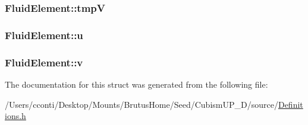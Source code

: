 \subsubsection[{tmp\+V}]{ Fluid\+Element\+::tmp\+V}\label{struct_fluid_element_a46027ac92e12443c175763fc0724a93c}
\hypertarget{struct_fluid_element_a3b438ee50f00308195df193026d81811}{}
\subsubsection[{u}]{ Fluid\+Element\+::u}\label{struct_fluid_element_a3b438ee50f00308195df193026d81811}
\hypertarget{struct_fluid_element_a6a99b2af6aa6cdba2f01ea8802da1749}{}
\subsubsection[{v}]{ Fluid\+Element\+::v}\label{struct_fluid_element_a6a99b2af6aa6cdba2f01ea8802da1749}


The documentation for this struct was generated from the following file\+:\begin{DoxyCompactItemize}
\item 
/\+Users/cconti/\+Desktop/\+Mounts/\+Brutus\+Home/\+Seed/\+Cubism\+U\+P\+\_\+D/source/\hyperlink{_definitions_8h}{Definitions.\+h}\end{DoxyCompactItemize}
